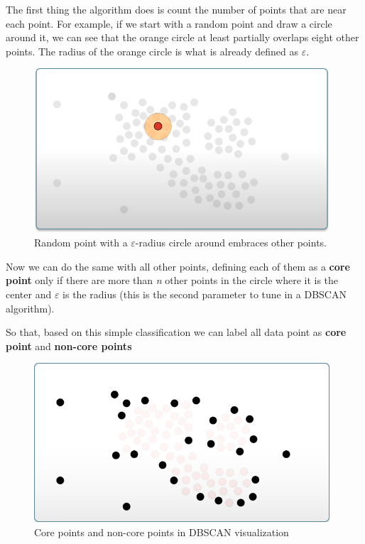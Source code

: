     The first thing the algorithm does is count the number of points that are near each point. For example, if we start with a random point and draw a circle around it, we can see that the orange circle at least partially overlaps eight other points. The radius of the orange circle is what is already defined as $\varepsilon$.
    
    \begin{figure}[H]
        \centering
        \includegraphics[width=11cm]{Images/1/dbscan-ex-2.png}
        \caption{Random point with a $\varepsilon$-radius circle around embraces other points.}
    \end{figure}
    
    Now we can do the same with all other points, defining each of them as a \textbf{core point} only if there are more than \textit{n} other points in the circle where it is the center and $\varepsilon$ is the radius (this is the second parameter to tune in a DBSCAN algorithm).
    
    So that, based on this simple classification we can label all data point as \textbf{core point} and \textbf{non-core points}

    \begin{figure}[H]
        \centering
        \includegraphics[width=11cm]{Images/1/dbscan-ex-3.png}
        \caption{Core points and non-core points in DBSCAN visualization}
    \end{figure}
    
